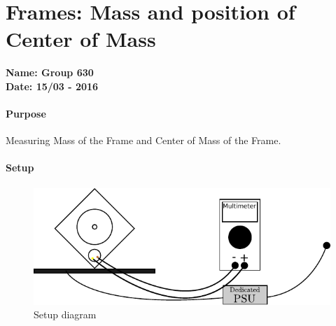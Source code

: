 \chapter{Frames: Mass and position of Center of Mass }\label{MassFrameCenterOfMass} 
\textbf{Name: Group 630}\\
\textbf{Date: 15/03 - 2016}

\subsubsection{Purpose}
Measuring Mass of the Frame and Center of Mass of the Frame.

\subsubsection{Setup}
\begin{figure}[H]
  \centering
	\includegraphics[scale=1]{figures/LabSetupLinearityTest.pdf}
	\caption{Setup diagram}
	\label{LabSetupRangeTest}
\end{figure}\vspace{-5mm}
%
